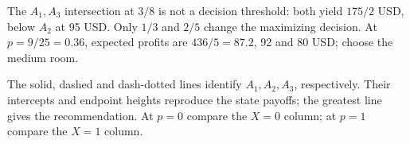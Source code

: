 The $A_1,A_3$ intersection at $3/8$ is not a decision threshold: both yield $175/2$ USD, below $A_2$ at 95 USD. Only $1/3$ and $2/5$ change the maximizing decision. At $p=9/25=0.36$, expected profits are $436/5=87.2$, 92 and 80 USD; choose the medium room.
\begin{center}\end{center}
The solid, dashed and dash-dotted lines identify $A_1,A_2,A_3$, respectively. Their intercepts and endpoint heights reproduce the state payoffs; the greatest line gives the recommendation. At $p=0$ compare the $X=0$ column; at $p=1$ compare the $X=1$ column.
\clearpage
